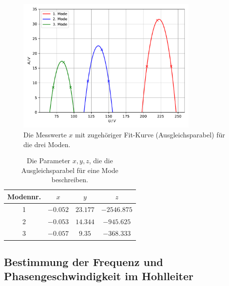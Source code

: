 \begin{figure}
    \centering
    \includegraphics[width=0.8\textwidth]{content/data/moden.pdf}
    \caption{Die Messwerte $x$ mit zugehöriger Fit-Kurve (Ausgleichsparabel) für die drei Moden. \cite{matplotlib}\cite{numpy}}
    \label{fig:moden}
\end{figure}

\begin{table}
    \centering
    \caption{Die Parameter $x, y, z$, die die Ausgleichsparabel für eine Mode beschreiben.}
    \begin{tabular}{c c c c}
        \toprule
        Modennr. & $x$ & $y$ & $z$ \\
        \midrule
        1 & $-0.052$ & $23.177$ & $-2546.875$ \\
        2 & $-0.053$ & $14.344$ & $-945.625$ \\
        3 & $-0.057$ & $9.35$ & $-368.333$ \\
        \bottomrule
    \end{tabular}
    \label{tab:moden_ergebnisse}
\end{table}

\subsection{Bestimmung der Frequenz und Phasengeschwindigkeit im Hohlleiter}
